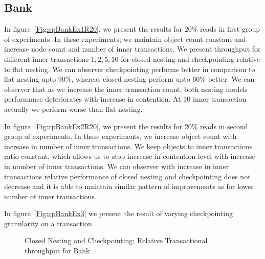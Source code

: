 \documentclass[12pt,english]{report}
\begin{document}
\subsection{Bank}
In figure~\ref{Fig:cpBankEx1R20}, we present the results for 20\% reads in first group of experiments. In these experiments, we maintain object count constant and increase node count and number of inner transactions. We present throughput for different inner transactions ${1, 2, 5, 10}$ for closed nesting and checkpointing relative to flat nesting. We can observer checkpointing performs better in comparison to flat nesting upto 90\%, whereas closed nesting perform upto 60\% better. We can observer that as we increase the inner transaction count, both nesting models performance deteriorates with increase in contention. At 10 inner transaction actually we perform worse than flat nesting.

In figure~\ref{Fig:cpBankEx2R20}, we present the results for 20\% reads in second group of experiments. In these experiments, we increase object count with increase in number of inner transactions. We keep objects to inner transactions ratio constant, which allows us to stop increase in contention level with increase in number of inner transactions. We can observer with increase in inner transactions relative performance of closed nesting and checkpointing does not decrease and it is able to maintain similar pattern of improvements as for lower number of inner transactions.

In figure~\ref{Fig:cpBankEx3} we present the result of varying checkpointing granularity on a transaction.

\begin{figure}[H]
\centering
{}
\end{figure}
\begin{figure}[H]
\centering
{}
\end{figure}
\begin{figure}[H]
\centering
{}
\caption{Closed Nesting and Checkpointing: Relative Transactional throughput for Bank}
\label{Fig:cpBank}
\end{figure}
\end{document}
